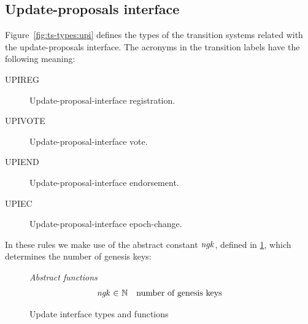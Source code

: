 \subsection{Update-proposals interface}
\label{sec:update-proposals-interface}

Figure~\ref{fig:ts-types:upi} defines the types of the transition systems
related with the update-proposals interface. The acronyms in the transition
labels have the following meaning:
\begin{description}
\item[UPIREG] Update-proposal-interface registration.
\item[UPIVOTE] Update-proposal-interface vote.
\item[UPIEND] Update-proposal-interface endorsement.
\item[UPIEC] Update-proposal-interface epoch-change.
\end{description}

In these rules we make use of the abstract constant $\mathit{ngk}$, defined in
\cref{fig:defs:upi}, which determines the number of genesis keys:

\begin{figure}[ht]
  \emph{Abstract functions}
  \begin{equation*}
    \begin{array}{r@{~\in~}lr}
      \var{ngk} & \mathbb{N} & \text{number of genesis keys}\\
    \end{array}
  \end{equation*}

  \caption{Update interface types and functions}
  \label{fig:defs:upi}
\end{figure}


